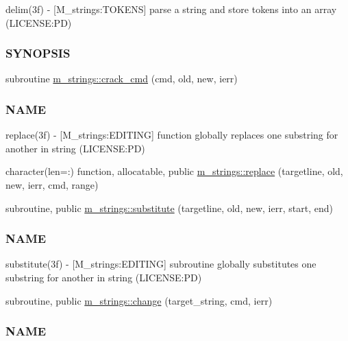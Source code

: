\begin{DoxyCompactItemize}
\begin{DoxyCompactList}
delim(3f) -\/ \mbox{[}M\+\_\+strings\+:T\+O\+K\+E\+NS\mbox{]} parse a string and store tokens into an array (L\+I\+C\+E\+N\+SE\+:PD) \subsubsection*{S\+Y\+N\+O\+P\+S\+IS}\end{DoxyCompactList}\item 
subroutine \mbox{\hyperlink{namespacem__strings_a818d715927dd61c1be6df5d2cdec4e4c}{m\+\_\+strings\+::crack\+\_\+cmd}} (cmd, old, new, ierr)
\begin{DoxyCompactList}\small\item\em \subsubsection*{N\+A\+ME}

replace(3f) -\/ \mbox{[}M\+\_\+strings\+:E\+D\+I\+T\+I\+NG\mbox{]} function globally replaces one substring for another in string (L\+I\+C\+E\+N\+SE\+:PD) \end{DoxyCompactList}\item 
character(len=\+:) function, allocatable, public \mbox{\hyperlink{namespacem__strings_ab5af73797bb08e7f654d39c9e8984ffe}{m\+\_\+strings\+::replace}} (targetline, old, new, ierr, cmd, range)
\item 
subroutine, public \mbox{\hyperlink{namespacem__strings_ab84a4b7c2be211433c2d1b435a87fa32}{m\+\_\+strings\+::substitute}} (targetline, old, new, ierr, start, end)
\begin{DoxyCompactList}\small\item\em \subsubsection*{N\+A\+ME}

substitute(3f) -\/ \mbox{[}M\+\_\+strings\+:E\+D\+I\+T\+I\+NG\mbox{]} subroutine globally substitutes one substring for another in string (L\+I\+C\+E\+N\+SE\+:PD) \end{DoxyCompactList}\item 
subroutine, public \mbox{\hyperlink{namespacem__strings_a1222f3b718f7637105bde330367925e1}{m\+\_\+strings\+::change}} (target\+\_\+string, cmd, ierr)
\begin{DoxyCompactList}\small\item\em \subsubsection*{N\+A\+ME}


\end{DoxyCompactList}
\end{DoxyCompactItemize}
